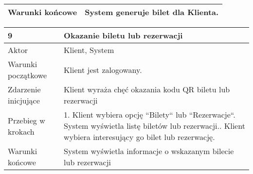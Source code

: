 \begin{tabularx}{\textwidth}{|l|X|}
Warunki końcowe        & System generuje bilet dla Klienta.                                                                                                                                                                                                                                                                                                                                                                                                                                                                                                                                                                                                                                                                                                                                                          \\ \hline
\end{tabularx}
\newpage
\begin{tabularx}{\textwidth}{|l|X|}
\hline
9                      & Okazanie biletu lub rezerwacji                                                                                                                                                                          \\ \hline
Aktor                  & Klient, System                                                                                                                                                                                          \\ \hline
Warunki początkowe     & Klient jest zalogowany.                                                                                                                                                                                 \\ \hline
Zdarzenie inicjujące   & Klient wyraża chęć okazania kodu QR biletu lub rezerwacji                                                                                                                                               \\ \hline
Przebieg w krokach     & 1. Klient wybiera opcję ``Bilety`` lub ``Rezerwacje``\newline 2. System wyświetla listę biletów lub rezerwacji.\newline 3. Klient wybiera interesujący go bilet lub rezerwację. \\ \hline
Warunki końcowe        & System wyświetla informacje o wskazanym bilecie lub rezerwacji                                                                                                                                          \\ \hline
\end{tabularx}
